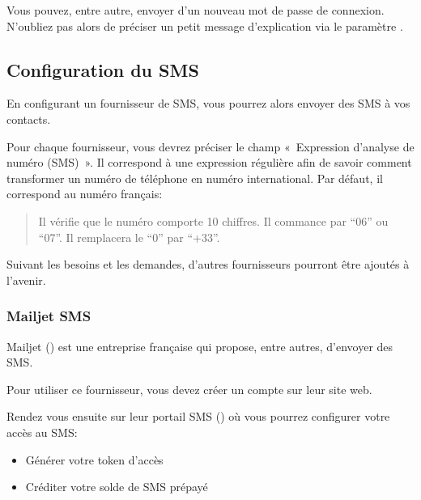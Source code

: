 \documentclass[a4paper,10pt,oneside,french]{sphinxmanual}
\begin{document}
\sphinxAtStartPar
Vous pouvez, entre autre, envoyer d’un nouveau mot de passe de connexion.
N’oubliez pas alors de préciser un petit message d’explication via le paramètre .


\subsection{Configuration du SMS}
\label{\detokenize{mailing/configuration:configuration-du-sms}}
\sphinxAtStartPar
En configurant un fournisseur de SMS, vous pourrez alors envoyer des SMS à vos contacts.

\sphinxAtStartPar
Pour chaque fournisseur, vous devrez préciser le champ « Expression d’analyse de numéro (SMS) ».
Il correspond à une expression régulière afin de savoir comment transformer un numéro de téléphone en numéro international.
Par défaut, il correspond au numéro français: 
\begin{quote}

\sphinxAtStartPar
Il vérifie que le numéro comporte 10 chiffres.
Il commance par “06” ou “07”.
Il remplacera le “0” par “+33”.
\end{quote}

\sphinxAtStartPar
Suivant les besoins et les demandes, d’autres fournisseurs pourront être ajoutés à l’avenir.


\subsubsection{Mailjet SMS}
\label{\detokenize{mailing/configuration:mailjet-sms}}
\sphinxAtStartPar
Mailjet () est une entreprise française qui propose, entre autres, d’envoyer des SMS.

\sphinxAtStartPar
Pour utiliser ce fournisseur, vous devez créer un compte sur leur site web.

\sphinxAtStartPar
Rendez vous ensuite sur leur portail SMS () où vous pourrez configurer votre accès au SMS:
\begin{itemize}
\item {} 
\sphinxAtStartPar
Générer votre token d’accès

\item {} 
\sphinxAtStartPar
Créditer votre solde de SMS prépayé

\end{itemize}
\end{document}
